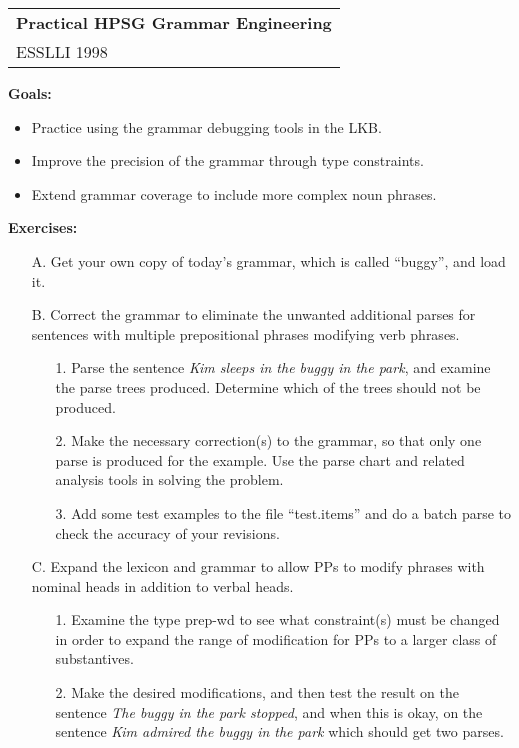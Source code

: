 \documentclass[10pt]{article}
\begin{document}
\begin{tabular}[t]{@{}l@{}}
\textbf{Practical HPSG Grammar Engineering}\\
ESSLLI 1998
\end{tabular}
\hfill
\mbox{}

\medskip
\textbf{Goals:}
\begin{itemize}
\item Practice using the grammar debugging tools in the LKB.
\item Improve the precision of the grammar through type constraints.
\item Extend grammar coverage to include more complex noun phrases. 
\end{itemize}

\smallskip
\textbf{Exercises:}
\begin{itemize}
\item[A.] Get your own copy of today's grammar, which is called
``buggy'', and load it.
\item[B.] Correct the grammar to eliminate the unwanted additional parses for sentences with multiple prepositional phrases modifying verb phrases.
\begin{itemize}
\item[1.] Parse the sentence \emph{Kim sleeps in the buggy in the park}, and examine the parse trees produced.  Determine which of the trees should not be produced.
\item[2.] Make the necessary correction(s) to the grammar, so that only one parse is produced for the example.  Use the parse chart and related analysis tools in solving the problem.
\item[3.] Add some test examples to the file ``test.items'' and do a batch parse to check the accuracy of your revisions.
\end{itemize}
\item[C.] Expand the lexicon and grammar to allow PPs to modify phrases with nominal heads in addition to verbal heads.
\begin{itemize}
\item[1.] Examine the type \textsf{prep-wd} to see what constraint(s) must be changed in order to expand the range of modification for PPs to a larger class of substantives.
\item[2.] Make the desired modifications, and then test the result on the sentence \emph{The buggy in the park stopped}, and when this is okay, on the sentence \emph{Kim admired the buggy in the park} which should get two parses.

\end{itemize}
\end{itemize}
\end{document}
